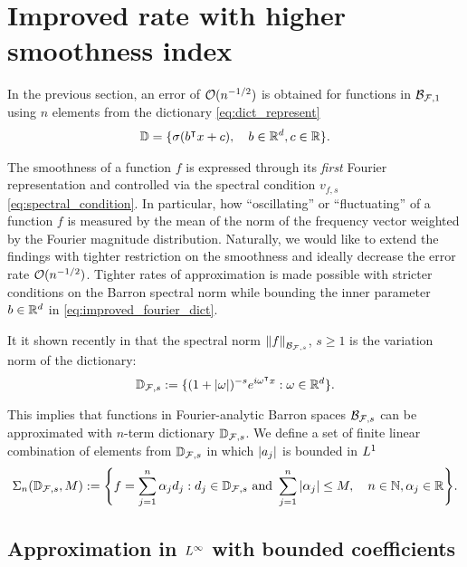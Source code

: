 \section{Improved rate with higher smoothness index}

In the previous section, an error of $\mathcal{O}(n^{-1/2})$ is obtained for functions
in $\mathcal{B}_{\mathcal{F}, 1}$ using $n$ elements from the dictionary
\eqref{eq:dict_represent}
\begin{align}
    \label{eq:improved_fourier_dict}
    \mathbb{D} = \{
        \sigma(b{}^{\intercal} x + c), \quad b\in\mathbb{R}^d, c\in\mathbb{R}
    \}.
\end{align}

The smoothness of a function $f$ is expressed through its \textit{first} Fourier
representation and controlled via the spectral condition $v_{f,s}$
\eqref{eq:spectral_condition}. In particular, how ``oscillating'' or
``fluctuating'' of a function $f$ is measured by the mean of the norm of the
frequency vector weighted by the Fourier magnitude distribution. Naturally, we
would like to extend the findings with tighter restriction on the smoothness and
ideally decrease the error rate $\mathcal{O}(n^{-1/2})$. Tighter rates of
approximation is made possible with stricter conditions on the Barron spectral
norm while bounding the inner parameter $b\in\mathbb{R}^d$ in
\eqref{eq:improved_fourier_dict}.

It it shown recently in \cite{siegelSharpBoundsApproximation2022} that the
spectral norm $\left\| f \right\|_{\mathcal{B}_{\mathcal{F}, s}}$, $s \geq 1$ is the variation
norm of the dictionary:
\begin{equation}
    \mathbb{D}_{\mathcal{F}, s} := \{
        (1 + \left| \omega \right|)^{-s} e^{i\omega{}^{\intercal} x}: \omega \in \mathbb{R}^d
    \}.
\end{equation}

This implies that functions in Fourier-analytic Barron spaces $\mathcal{B}_{\mathcal{F},
s}$ can be approximated with $n$-term dictionary $\mathbb{D}_{\mathcal{F}, s}$. We
define a set of finite linear combination of elements from
$\mathbb{D}_{\mathcal{F},s}$ in which $\left| a_j \right|$ is bounded in $L^{1}$
\begin{equation}
    \Sigma_n(\mathbb{D}_{\mathcal{F}, s}, M) := \Bigg\{
        f = \sum_{j=1}^n \alpha_j d_j: 
        d_j \in \mathbb{D}_{\mathcal{F}, s} \textnormal{ and } 
        \sum_{j=1}^n \left| \alpha_j \right| \leq M, \quad 
        n \in \mathbb{N}, \alpha_j \in \mathbb{R}
    \Bigg\}.
\end{equation}


\subsection{Approximation in $L^{\infty}$ with bounded coefficients}

